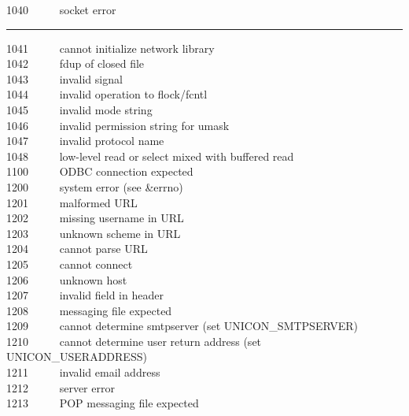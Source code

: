 1040 \ \ \ \ \ socket error\\

\bigskip\hrule\vspace{0.1cm}

1041 \ \ \ \ \ cannot initialize network library\\
1042 \ \ \ \ \ fdup of closed file\\
1043 \ \ \ \ \ invalid signal\\
1044 \ \ \ \ \ invalid operation to flock/fcntl\\
1045 \ \ \ \ \ invalid mode string\\
1046 \ \ \ \ \ invalid permission string for umask\\
1047 \ \ \ \ \ invalid protocol name\\
1048 \ \ \ \ \ low-level read or select mixed with buffered read\\
1100 \ \ \ \ \ ODBC connection expected\\
1200 \ \ \ \ \ system error (see \&errno)\\
1201 \ \ \ \ \ malformed URL\\
1202 \ \ \ \ \ missing username in URL\\
1203 \ \ \ \ \ unknown scheme in URL\\
1204 \ \ \ \ \ cannot parse URL\\
1205 \ \ \ \ \ cannot connect\\
1206 \ \ \ \ \ unknown host\\
1207 \ \ \ \ \ invalid field in header\\
1208 \ \ \ \ \ messaging file expected\\
1209 \ \ \ \ \ cannot determine smtpserver
(set UNICON\_SMTPSERVER)\\
1210 \ \ \ \ \ cannot determine user return address
(set UNICON\_USERADDRESS)\\
1211 \ \ \ \ \ invalid email address\\
1212 \ \ \ \ \ server error\\
1213 \ \ \ \ \ POP messaging file expected\\
